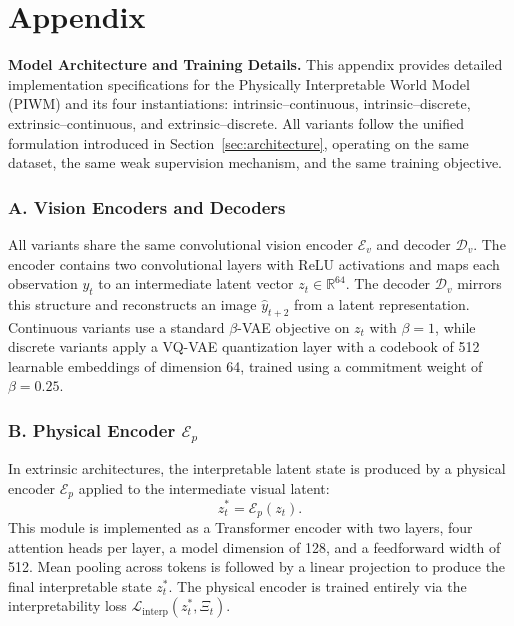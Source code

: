 \documentclass[nonacm,sigconf]{acmart}
\begin{document}

\newpage





\newpage

\clearpage


\appendix
\section*{Appendix}

\textbf{Model Architecture and Training Details.} This appendix provides detailed implementation specifications for the Physically
Interpretable World Model (PIWM) and its four instantiations:
intrinsic--continuous, intrinsic--discrete, extrinsic--continuous, and
extrinsic--discrete. All variants follow the unified formulation introduced in
Section~\ref{sec:architecture}, operating on the same dataset, the same weak
supervision mechanism, and the same training objective.

\subsubsection*{A. Vision Encoders and Decoders}

All variants share the same convolutional vision encoder $\mathcal{E}_v$ and
decoder $\mathcal{D}_v$. The encoder contains two convolutional layers with ReLU
activations and maps each observation $y_t$ to an intermediate latent vector
$z_t \in \mathbb{R}^{64}$. The decoder $\mathcal{D}_v$ mirrors this structure
and reconstructs an image $\hat{y}_{t+2}$ from a latent representation.  
Continuous variants use a standard $\beta$-VAE objective on $z_t$ with
$\beta = 1$, while discrete variants apply a VQ-VAE quantization layer with a
codebook of 512 learnable embeddings of dimension 64, trained using a
commitment weight of $\beta = 0.25$.

\subsubsection*{B. Physical Encoder $\mathcal{E}_p$}

In extrinsic architectures, the interpretable latent state is produced by a
physical encoder $\mathcal{E}_p$ applied to the intermediate visual latent:
\[
z^*_t = \mathcal{E}_p(z_t).
\]
This module is implemented as a Transformer encoder with two layers, four
attention heads per layer, a model dimension of 128, and a feedforward width of
512. Mean pooling across tokens is followed by a linear projection to produce
the final interpretable state $z^*_t$. The physical encoder is trained entirely
via the interpretability loss $\mathcal{L}_{\text{interp}}(z^*_t, \Xi_t)$.
\end{document}
